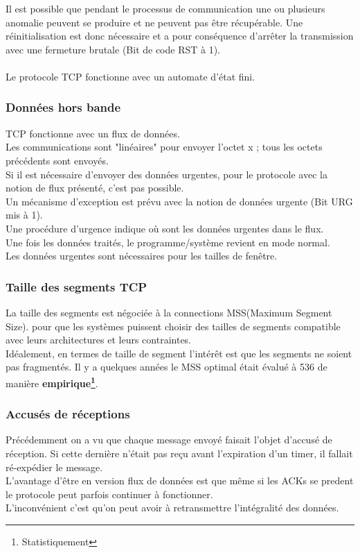 \documentclass{article}
\begin{document}
Il est possible que pendant le processus de communication une ou plusieurs anomalie peuvent se produire et ne peuvent pas être récupérable. Une réinitialisation est donc nécessaire et a pour conséquence d'arrêter la transmission avec une fermeture brutale (Bit de code RST à 1). \\
\\
Le protocole TCP fonctionne avec un automate d'état fini.
\subsubsection{Données hors bande}
TCP fonctionne avec un flux de données. \\
Les communications sont "linéaires" pour envoyer l'octet x ; tous les octets précédents sont envoyés. \\
Si il est nécessaire d'envoyer des données urgentes, pour le protocole avec la notion de flux présenté, c'est pas possible. 
\\ 
Un mécanisme d'exception est prévu avec la notion de données urgente (Bit URG mis à 1). \\
Une procédure d'urgence indique où sont les données urgentes dans le flux. \\
Une fois les données traités, le programme/système revient en mode normal. \\
Les données urgentes sont nécessaires pour les tailles de fenêtre.
\newpage
\subsubsection{Taille des segments TCP}
La taille des segments est négociée à la connections MSS(Maximum Segment Size). pour que les systèmes puissent choisir des tailles de segments compatible avec leurs architectures et leurs contraintes. \\
Idéalement, en termes de taille de segment l'intérêt est que les segments ne soient pas fragmentés. Il y a quelques années le MSS optimal était évalué à 536 de manière \textbf{empirique\footnote{Statistiquement}}.
\subsubsection{Accusés de réceptions}
Précédemment on a vu que chaque message envoyé faisait l'objet d'accusé de réception. Si cette dernière n'était pas reçu avant l'expiration d'un timer, il fallait ré-expédier le message. \\
L'avantage d'être en version flux de données est que même si les ACKs se predent le protocole peut parfois continuer à fonctionner. \\
L'inconvénient c'est qu'on peut avoir à retransmettre l'intégralité des données.
\end{document}
